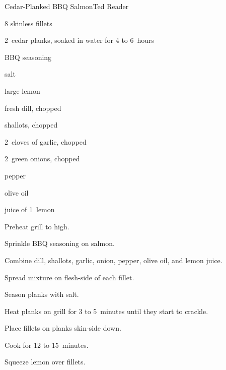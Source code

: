\begin{recipe}{Cedar-Planked BBQ Salmon}{Ted Reader}{}

\begin{ingredients}
\item 8   skinless fillets
\item 2~cedar planks, soaked in water for 4 to 6~hours
\item {} BBQ seasoning
\item salt
\item large lemon
\item {} fresh dill, chopped
\item \C{\half} shallots, chopped
\item 2~cloves of garlic, chopped
\item 2~green onions, chopped
\item {} pepper
\item {} olive oil
\item juice of 1~lemon
\end{ingredients}

\begin{directions}
\item Preheat grill to high.
\item Sprinkle BBQ seasoning on salmon.
\item Combine dill, shallots, garlic, onion, pepper, olive oil, and lemon juice.
\item Spread mixture on flesh-side of each fillet.
\item Season planks with salt.
\item Heat planks on grill for 3 to 5~minutes until they start to crackle.
\item Place fillets on planks skin-side down.
\item Cook for 12 to 15~minutes.
\item Squeeze lemon over fillets.
\end{directions}

\end{recipe}
